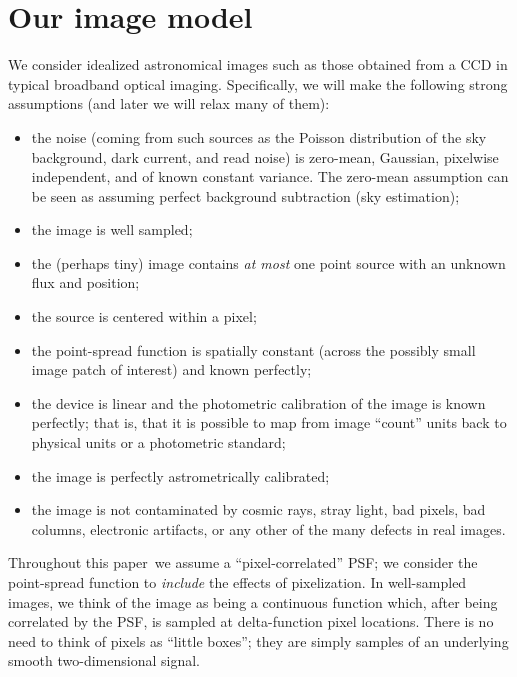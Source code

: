 \documentclass[11pt,letterpaper,linenumbers]{aastex63}
\newcommand{\doctype}{paper}
\begin{document}
\section{Our image model}

We consider idealized astronomical images such as those obtained from
a CCD in typical broadband optical imaging.
Specifically, we will make the following strong assumptions
(and later we will relax many of them):
\begin{itemize}
\item the noise (coming from such sources as the Poisson distribution
  of the sky background, dark current, and read noise) is zero-mean,
  Gaussian, pixelwise independent, and of known constant variance.  The
  zero-mean assumption can be seen as assuming perfect background
  subtraction (sky estimation);
\item the image is well sampled;
\item the (perhaps tiny) image contains \emph{at most} one point
  source with an unknown flux and position;
\item the source is centered within a pixel; %
\item the point-spread function is spatially constant (across the
  possibly small image patch of interest) and known perfectly;
\item the device is linear and the photometric calibration of the
  image is known perfectly; that is, that it is possible to map from
  image ``count'' units back to physical units or a photometric
  standard;
\item the image is perfectly astrometrically calibrated;
\item the image is not contaminated by cosmic rays, stray light, bad
  pixels, bad columns, electronic artifacts, or any other of the many
  defects in real images.
\end{itemize}

Throughout this \doctype\ we assume a ``pixel-correlated'' PSF; we
consider the point-spread function to \emph{include} the effects of
pixelization.  In well-sampled images, we think of the image as being
a continuous function which, after being correlated by the PSF, is
sampled at delta-function pixel locations.  There is no need to think
of pixels as ``little boxes''; they are simply samples of an
underlying smooth two-dimensional signal.

\end{document}
